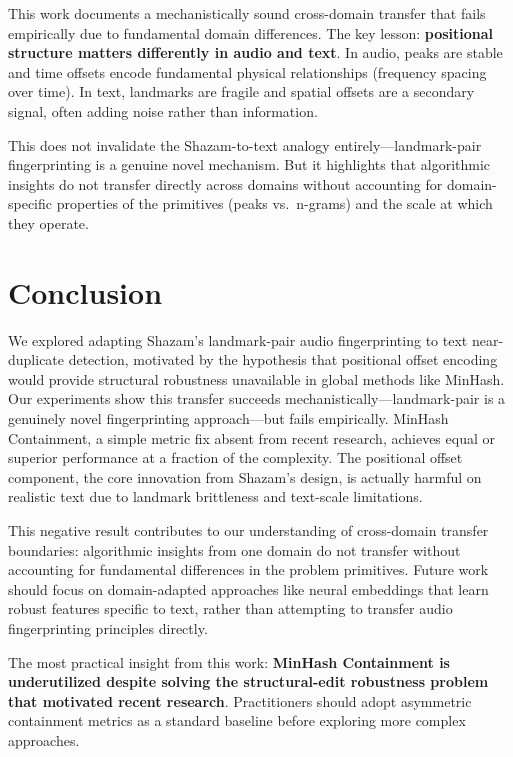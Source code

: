 \documentclass[11pt,letterpaper]{article}
\begin{document}
This work documents a mechanistically sound cross-domain transfer that fails empirically due to fundamental domain differences. The key lesson: \textbf{positional structure matters differently in audio and text}. In audio, peaks are stable and time offsets encode fundamental physical relationships (frequency spacing over time). In text, landmarks are fragile and spatial offsets are a secondary signal, often adding noise rather than information.

This does not invalidate the Shazam-to-text analogy entirely---landmark-pair fingerprinting is a genuine novel mechanism. But it highlights that algorithmic insights do not transfer directly across domains without accounting for domain-specific properties of the primitives (peaks vs.\ n-grams) and the scale at which they operate.

\section{Conclusion}

We explored adapting Shazam's landmark-pair audio fingerprinting to text near-duplicate detection, motivated by the hypothesis that positional offset encoding would provide structural robustness unavailable in global methods like MinHash. Our experiments show this transfer succeeds mechanistically---landmark-pair is a genuinely novel fingerprinting approach---but fails empirically. MinHash Containment, a simple metric fix absent from recent research, achieves equal or superior performance at a fraction of the complexity. The positional offset component, the core innovation from Shazam's design, is actually harmful on realistic text due to landmark brittleness and text-scale limitations.

This negative result contributes to our understanding of cross-domain transfer boundaries: algorithmic insights from one domain do not transfer without accounting for fundamental differences in the problem primitives. Future work should focus on domain-adapted approaches like neural embeddings that learn robust features specific to text, rather than attempting to transfer audio fingerprinting principles directly.

The most practical insight from this work: \textbf{MinHash Containment is underutilized despite solving the structural-edit robustness problem that motivated recent research}. Practitioners should adopt asymmetric containment metrics as a standard baseline before exploring more complex approaches.



\end{document}
